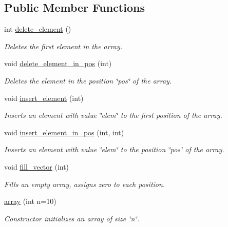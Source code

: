 \subsection*{Public Member Functions}
\begin{DoxyCompactItemize}
\item 
int \hyperlink{classarray_a1264f89751d04076f0c9e40dd548b34a}{delete\-\_\-element} ()
\begin{DoxyCompactList}\small\item\em Deletes the first element in the array. \end{DoxyCompactList}\item 
void \hyperlink{classarray_a6866ed5e8568471e8fa5012214e8b31b}{delete\-\_\-element\-\_\-in\-\_\-pos} (int)
\begin{DoxyCompactList}\small\item\em Deletes the element in the position \char`\"{}pos\char`\"{} of the array. \end{DoxyCompactList}\item 
void \hyperlink{classarray_aeddcdc0e56dc8cea81f9031200722317}{insert\-\_\-element} (int)
\begin{DoxyCompactList}\small\item\em Inserts an element with value \char`\"{}elem\char`\"{} to the first position of the array. \end{DoxyCompactList}\item 
void \hyperlink{classarray_a3f88ff1af571a2a320e6ef79de2722fb}{insert\-\_\-element\-\_\-in\-\_\-pos} (int, int)
\begin{DoxyCompactList}\small\item\em Inserts an element with value \char`\"{}elem\char`\"{} to the position \char`\"{}pos\char`\"{} of the array. \end{DoxyCompactList}\item 
void \hyperlink{classarray_a1907d4f2b944c0acd6f45d4659e49646}{fill\-\_\-vector} (int)
\begin{DoxyCompactList}\small\item\em Fills an empty array, assigns zero to each position. \end{DoxyCompactList}\item 
\hyperlink{classarray_aedfc14adc0aaa8398258794564f79b22}{array} (int n=10)
\begin{DoxyCompactList}\small\item\em Constructor initializes an array of size \char`\"{}n\char`\"{}. \end{DoxyCompactList}\item 

\end{DoxyCompactItemize}
